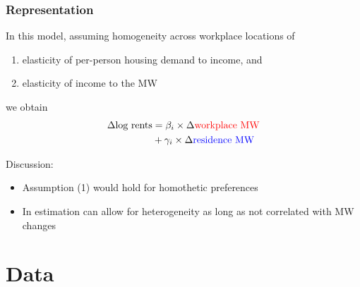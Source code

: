 \documentclass[aspectratio=169, t]{beamer}
\begin{document}
\begin{frame}
    \frametitle{Representation}

    In this model, assuming homogeneity across workplace locations of
    \begin{enumerate}
        \item elasticity of per-person housing demand to income, and
        \item elasticity of income to the MW
    \end{enumerate}
    we obtain
    \[
    \begin{split}
        \Delta \text{log rents} & = \beta_i  \times \Delta {\color{red}  \text{workplace MW}} \\
                                & + \gamma_i \times \Delta {\color{blue} \text{residence MW}} \\
    \end{split}
    \]

    \vspace{3mm}
    \pause
    Discussion:
    \begin{itemize}
        \item Assumption (1) would hold for homothetic preferences
        \item In estimation can allow for heterogeneity as long as not correlated with MW changes
    \end{itemize}

\end{frame}


\section{Data}
\end{document}
